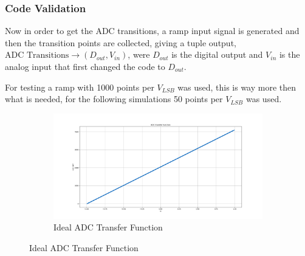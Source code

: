 \subsubsection{Code Validation}

Now in order to get the ADC transitions, a ramp input signal is generated and then the transition points are collected, giving a tuple output, $\text{ADC Transitions} \longrightarrow ( D_{out}, V_{in} ) $, were $D_{out}$ is the digital output and $V_{in}$ is the analog input that first changed the code to $D_{out}$. 

For testing a ramp with 1000 points per $V_{LSB}$ was used, this is way more then what is needed, for the following simulations 50 points per $V_{LSB}$ was used.


\begin{figure}[H]
    \centering

    \begin{subfigure}[b]{0.9\textwidth}
        \centering
        \includegraphics[width=\textwidth]{Images/ADC_TransFunc_Ideal.png}
        \caption{Ideal ADC Transfer Function}
        \label{fig:ADC_TF_Ideal}
    \end{subfigure}%


\end{figure}
